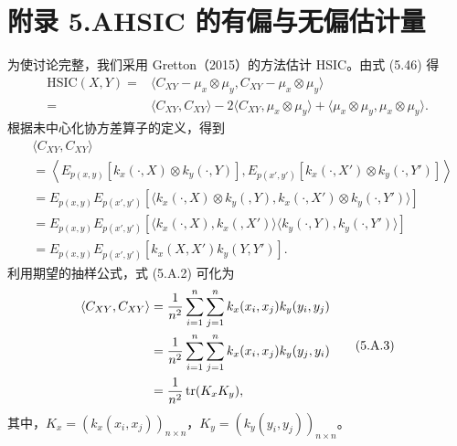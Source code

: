 \section*{附录 5.A\quad HSIC 的有偏与无偏估计量}

为使讨论完整，我们采用 Gretton（2015）的方法估计 HSIC。由式 (5.46) 得
\begin{equation}
\begin{aligned}
\mathrm{HSIC}(X,Y)
={}&\langle C_{XY}-\mu_x\otimes\mu_y,C_{XY}-\mu_x\otimes\mu_y\rangle\\
={}&\langle C_{XY},C_{XY}\rangle-2\langle C_{XY},\mu_x\otimes\mu_y\rangle
+\langle\mu_x\otimes\mu_y,\mu_x\otimes\mu_y\rangle.
\end{aligned}
\tag{5.A.1}
\end{equation}
根据未中心化协方差算子的定义，得到
\begin{equation}
\begin{aligned}
&\langle C_{XY},C_{XY}\rangle\\
&=\left\langle E_{p(x,y)}[k_x(\cdot,X)\otimes k_y(\cdot,Y)],
E_{p(x',y')}[k_x(\cdot,X')\otimes k_y(\cdot,Y')]\right\rangle\\
&=E_{p(x,y)}E_{p(x',y')}
\left[\langle k_x(\cdot,X)\otimes k_y(,Y),k_x(\cdot,X')\otimes k_y(\cdot,Y')\rangle\right]\\
&=E_{p(x,y)}E_{p(x',y')}
\left[\langle k_x(\cdot,X),k_x(,X')\rangle
\langle k_y(\cdot,Y),k_y(\cdot,Y')\rangle\right]\\
&=E_{p(x,y)}E_{p(x',y')}[k_x(X,X')k_y(Y,Y')].
\end{aligned}
\tag{5.A.2}
\end{equation}
利用期望的抽样公式，式 (5.A.2) 可化为
\begin{equation}
\begin{aligned}
\langle C_{XY},C_{XY}\rangle
&=\frac1{n^2}\sum_{i=1}^n\sum_{j=1}^nk_x(x_i,x_j)k_y(y_i,y_j)\\
&=\frac1{n^2}\sum_{i=1}^n\sum_{j=1}^nk_x(x_i,x_j)k_y(y_j,y_i)\\
&=\frac1{n^2}\operatorname{tr}(K_xK_y),
\end{aligned}
\tag{5.A.3}
\end{equation}
其中，$K_x=(k_x(x_i,x_j))_{n\times n}$，$K_y=(k_y(y_i,y_j))_{n\times n}$。

